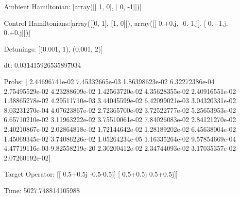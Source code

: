 \documentclass{article}
\begin{document}
    

\newpage

Ambient Hamiltonian: [array([[ 1,  0],
       [ 0, -1]])]

Control Hamiltonians:[array([[0, 1],
       [1, 0]]), array([[ 0.+0.j, -0.-1.j],
       [ 0.+1.j,  0.+0.j]])]

Detunings: [(0.001, 1), (0.001, 2)]

 dt: 0.031415926535897934

Probs: [  2.44696741e-02   7.45332665e-03   1.86398623e-02   6.32272386e-04
   2.75495529e-02   4.23288609e-02   1.42563720e-02   4.35628355e-02
   2.40916551e-02   1.38865278e-02   4.29511710e-03   3.44045599e-02
   6.42099021e-03   3.04320331e-02   8.03231270e-04   4.07623867e-02
   2.72365700e-02   3.72522777e-02   5.25653953e-02   6.65710210e-02
   3.11963222e-02   3.75510061e-02   7.84026083e-02   2.84121270e-02
   2.40210867e-02   2.02864818e-02   1.72144642e-02   1.28189202e-02
   6.45638004e-02   1.45069345e-02   3.74086226e-02   1.05264234e-05
   1.16335264e-02   9.57854669e-04   4.47719116e-03   9.82558219e-20
   2.30200412e-02   2.34744093e-02   3.17035357e-02   2.07260192e-02]

Target Operator: [[ 0.5+0.5j -0.5-0.5j]
 [ 0.5+0.5j  0.5+0.5j]]

Time: 5027.748814105988
\end{document}

